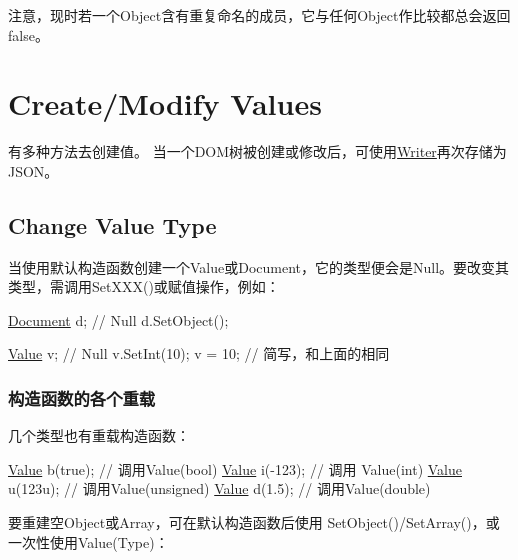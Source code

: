注意，现时若一个\+Object含有重复命名的成员，它与任何\+Object作比较都总会返回{\ttfamily false}。\hypertarget{md_Cadriciel_Commun_Externe_RapidJSON_doc_tutorial.zh-cn_CreateModifyValues}{}\section{Create/\+Modify Values}\label{md_Cadriciel_Commun_Externe_RapidJSON_doc_tutorial.zh-cn_CreateModifyValues}
有多种方法去创建值。 当一个\+D\+O\+M树被创建或修改后，可使用{\ttfamily \hyperlink{class_writer}{Writer}}再次存储为\+J\+S\+O\+N。\hypertarget{md_Cadriciel_Commun_Externe_RapidJSON_doc_tutorial.zh-cn_ChangeValueType}{}\subsection{Change Value Type}\label{md_Cadriciel_Commun_Externe_RapidJSON_doc_tutorial.zh-cn_ChangeValueType}
当使用默认构造函数创建一个\+Value或\+Document，它的类型便会是\+Null。要改变其类型，需调用{\ttfamily Set\+X\+X\+X()}或赋值操作，例如：


\begin{DoxyCode}
\hyperlink{class_generic_document}{Document} d; \textcolor{comment}{// Null}
d.SetObject();

\hyperlink{class_generic_value}{Value} v;    \textcolor{comment}{// Null}
v.SetInt(10);
v = 10;     \textcolor{comment}{// 简写，和上面的相同}
\end{DoxyCode}


\subsubsection*{构造函数的各个重载}

几个类型也有重载构造函数：


\begin{DoxyCode}
\hyperlink{class_generic_value}{Value} b(\textcolor{keyword}{true});    \textcolor{comment}{// 调用Value(bool)}
\hyperlink{class_generic_value}{Value} i(-123);    \textcolor{comment}{// 调用 Value(int)}
\hyperlink{class_generic_value}{Value} u(123u);    \textcolor{comment}{// 调用Value(unsigned)}
\hyperlink{class_generic_value}{Value} d(1.5);     \textcolor{comment}{// 调用Value(double)}
\end{DoxyCode}


要重建空\+Object或\+Array，可在默认构造函数后使用 {\ttfamily Set\+Object()}/{\ttfamily Set\+Array()}，或一次性使用{\ttfamily Value(\+Type)}：


